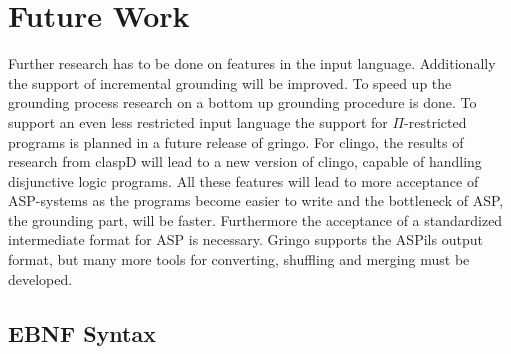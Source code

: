 \documentclass[a4paper,10pt]{article}
\begin{document}
\section{Future Work}
Further research has to be done on features in the input language. Additionally the support of incremental grounding will be improved. To speed up the grounding process research on a bottom up grounding procedure is done. To support an even less restricted input language the support for $\Pi$-restricted programs is planned in a future release of gringo. For clingo, the results of research from claspD will lead to a new version of clingo, capable of handling disjunctive logic programs. All these features will lead to more acceptance of ASP-systems as the programs become easier to write and the bottleneck of ASP, the grounding part, will be faster.
Furthermore the acceptance of a standardized intermediate format for ASP is necessary. Gringo supports the ASPils output format, but many more tools for converting, shuffling and merging must be developed.
\newpage
\textbf{\appendixname}
\begin{appendix}
\section{EBNF Syntax}
\label{appendix}

\end{appendix}



\appendix
\end{document}
